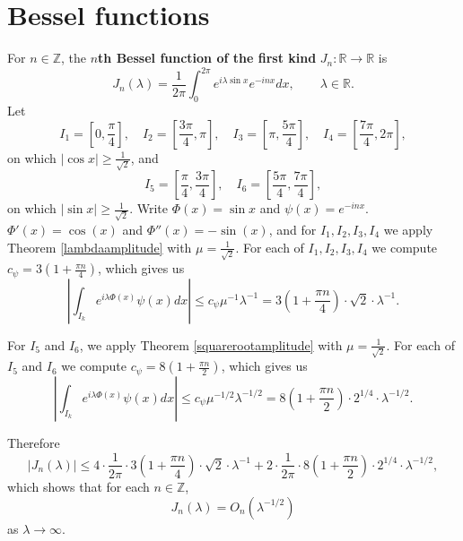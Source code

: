 \documentclass{article}
\theoremstyle{definition}
\theoremstyle{definition}
\begin{document}
\section{Bessel functions}
For $n \in \mathbb{Z}$, the \textbf{$n$th Bessel function of the first kind} $J_n:\mathbb{R} \to \mathbb{R}$ is
\[
J_n(\lambda) = \frac{1}{2\pi} \int_0^{2\pi} e^{i\lambda \sin x} e^{-inx} dx, \qquad \lambda\in \mathbb{R}.
\]
Let
\[
I_1 = \left[0,\frac{\pi}{4}\right], \quad I_2 = \left[ \frac{3\pi}{4},\pi \right], \quad  I_3 = \left[\pi,\frac{5\pi}{4}\right], \quad I_4= \left[\frac{7\pi}{4},2\pi\right],
\]
on which $|\cos x| \geq \frac{1}{\sqrt{2}}$, and
\[
I_5 = \left[\frac{\pi}{4},\frac{3\pi}{4}\right], \quad I_6=\left[\frac{5\pi}{4},\frac{7\pi}{4}\right],
\]
on which $|\sin x| \geq \frac{1}{\sqrt{2}}$. 
Write $\Phi(x)=\sin x$ and $\psi(x)=e^{-inx}$. $\Phi'(x)=\cos(x)$ and $\Phi''(x)=-\sin(x)$, 
and for $I_1,I_2,I_3,I_4$ we apply Theorem \ref{lambdaamplitude} with $\mu=\frac{1}{\sqrt{2}}$.
For each of $I_1,I_2,I_3,I_4$ we compute $c_\psi = 3\left(1+\frac{\pi n}{4}\right)$, 
which gives us
\[
\left| \int_{I_k} e^{i\lambda \Phi(x)} \psi(x) dx \right| \leq c_\psi \mu^{-1} \lambda^{-1}
=3\left(1+\frac{\pi n}{4}\right) \cdot \sqrt{2} \cdot \lambda^{-1}.
\]


For $I_5$ and $I_6$, we apply Theorem \ref{squarerootamplitude} with $\mu=\frac{1}{\sqrt{2}}$. For each of $I_5$ and $I_6$ we compute
$c_\psi = 8\left(1+\frac{\pi n}{2} \right)$, which gives us
\[
\left| \int_{I_k} e^{i\lambda \Phi(x)} \psi(x) dx \right| \leq c_\psi \mu^{-1/2} \lambda^{-1/2} = 
 8\left(1+\frac{\pi n}{2} \right) \cdot 2^{1/4} \cdot \lambda^{-1/2}.
\]

Therefore
\[
|J_n(\lambda)| \leq 4\cdot\frac{1}{2\pi} \cdot 3\left(1+\frac{\pi n}{4}\right) \cdot \sqrt{2} \cdot \lambda^{-1}
+ 2 \cdot \frac{1}{2\pi} \cdot 8\left(1+\frac{\pi n}{2} \right) \cdot 2^{1/4} \cdot \lambda^{-1/2},
\]
which shows that for each $n \in \mathbb{Z}$,
\[
J_n(\lambda) = O_n(\lambda^{-1/2})
\]
as $\lambda \to \infty$.
\end{document}

